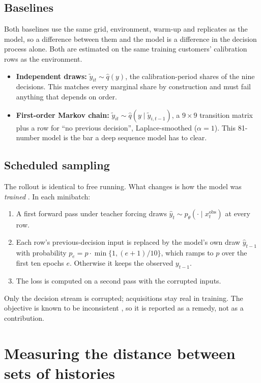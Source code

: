 \documentclass[11pt]{article}
\begin{document}
\subsection{Baselines}

Both baselines use the same grid, environment, warm-up and replicates as the
model, so a difference between them and the model is a difference in the
decision process alone. Both are estimated on the same training customers'
calibration rows as the environment.
\begin{itemize}
\item \textbf{Independent draws:} $\tilde y_{it} \sim \hat q(y)$, the
  calibration-period shares of the nine decisions. This matches every marginal
  share by construction and must fail anything that depends on order.
\item \textbf{First-order Markov chain:}
  $\tilde y_{it} \sim \hat q(y \mid \tilde y_{i,t-1})$, a $9\times 9$
  transition matrix plus a row for ``no previous decision'', Laplace-smoothed
  ($\alpha = 1$). This 81-number model is the bar a deep sequence model has to
  clear.
\end{itemize}

\subsection{Scheduled sampling}

The rollout is identical to free running. What changes is how the model was
\emph{trained} \citep{bengio2015}. In each minibatch:
\begin{enumerate}
\item A first forward pass under teacher forcing draws
  $\hat y_{t} \sim p_\theta(\cdot \mid x_t^{\text{obs}})$ at every row.
\item Each row's previous-decision input is replaced by the model's own draw
  $\hat y_{t-1}$ with probability $p_e = p\cdot\min\{1, (e+1)/10\}$, which ramps
  to $p$ over the first ten epochs $e$. Otherwise it keeps the observed
  $y_{t-1}$.
\item The loss is computed on a second pass with the corrupted inputs.
\end{enumerate}
Only the decision stream is corrupted; acquisitions stay real in training. The
objective is known to be inconsistent \citep{huszar2015}, so it is reported as
a remedy, not as a contribution.

\section{Measuring the distance between sets of histories}\label{sec:metric}
\end{document}

